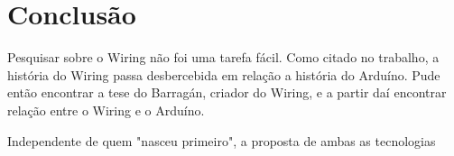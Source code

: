 \chapter{Conclusão}

Pesquisar sobre o Wiring não foi uma tarefa fácil. Como citado no trabalho, a história do Wiring passa desbercebida em relação a história do Arduíno. Pude então encontrar a tese do Barragán, criador do Wiring, e a partir daí encontrar relação entre o Wiring e o Arduíno.

Independente de quem "nasceu primeiro", a proposta de ambas as tecnologias
